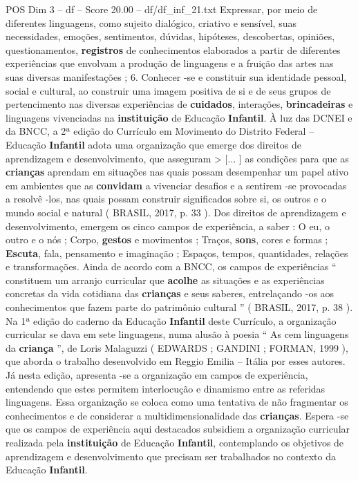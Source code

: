 \begin{textsample}{POS Dim 3 – df – Score 20.00 – df/df\_inf\_21.txt}
Expressar, por meio de diferentes linguagens, como sujeito dialógico, criativo e sensível, suas necessidades, emoções, sentimentos, dúvidas, hipóteses, descobertas, opiniões, questionamentos, \textbf{registros} de conhecimentos elaborados a partir de diferentes experiências que envolvam a produção de linguagens e a fruição das artes nas suas diversas manifestações ; 6.
Conhecer -se e constituir sua identidade pessoal, social e cultural, ao construir uma imagem positiva de si e de seus grupos de pertencimento nas diversas experiências de \textbf{cuidados}, interações, \textbf{brincadeiras} e linguagens vivenciadas na \textbf{instituição} de Educação \textbf{Infantil}.
À luz das DCNEI e da BNCC, a 2ª edição do Currículo em Movimento do Distrito Federal – Educação \textbf{Infantil} adota uma organização que emerge dos direitos de aprendizagem e desenvolvimento, que asseguram > [... ] as condições para que as \textbf{crianças} aprendam em situações nas quais possam desempenhar um papel ativo em ambientes que as \textbf{convidam} a vivenciar desafios e a sentirem -se provocadas a resolvê -los, nas quais possam construir significados sobre si, os outros e o mundo social e natural ( BRASIL, 2017, p. 33 ).
Dos direitos de aprendizagem e desenvolvimento, emergem os cinco campos de experiência, a saber : O eu, o outro e o nós ; Corpo, \textbf{gestos} e movimentos ; Traços, \textbf{sons}, cores e formas ; \textbf{Escuta}, fala, pensamento e imaginação ; Espaços, tempos, quantidades, relações e transformações.
Ainda de acordo com a BNCC, os campos de experiências “ constituem um arranjo curricular que \textbf{acolhe} as situações e as experiências concretas da vida cotidiana das \textbf{crianças} e seus saberes, entrelaçando -os aos conhecimentos que fazem parte do patrimônio cultural ” ( BRASIL, 2017, p. 38 ).
Na 1ª edição do caderno da Educação \textbf{Infantil} deste Currículo, a organização curricular se dava em sete linguagens, numa alusão à poesia “ As cem linguagens da \textbf{criança} ”, de Loris Malaguzzi ( EDWARDS ; GANDINI ; FORMAN, 1999 ), que aborda o trabalho desenvolvido em Reggio Emilia – Itália por esses autores.
Já nesta edição, apresenta -se a organização em campos de experiência, entendendo que estes permitem interlocução e dinamismo entre as referidas linguagens.
Essa organização se coloca como uma tentativa de não fragmentar os conhecimentos e de considerar a multidimensionalidade das \textbf{crianças}.
Espera -se que os campos de experiência aqui destacados subsidiem a organização curricular realizada pela \textbf{instituição} de Educação \textbf{Infantil}, contemplando os objetivos de aprendizagem e desenvolvimento que precisam ser trabalhados no contexto da Educação \textbf{Infantil}.

\end{textsample}
